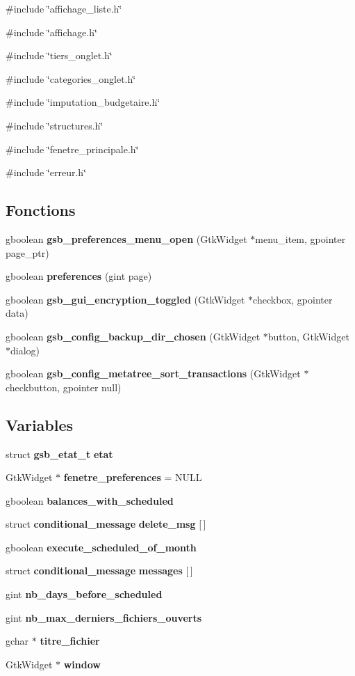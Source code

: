 {\ttfamily \#include \char`\"{}affichage\_\-liste.h\char`\"{}}\par
{\ttfamily \#include \char`\"{}affichage.h\char`\"{}}\par
{\ttfamily \#include \char`\"{}tiers\_\-onglet.h\char`\"{}}\par
{\ttfamily \#include \char`\"{}categories\_\-onglet.h\char`\"{}}\par
{\ttfamily \#include \char`\"{}imputation\_\-budgetaire.h\char`\"{}}\par
{\ttfamily \#include \char`\"{}structures.h\char`\"{}}\par
{\ttfamily \#include \char`\"{}fenetre\_\-principale.h\char`\"{}}\par
{\ttfamily \#include \char`\"{}erreur.h\char`\"{}}\par
\subsection*{Fonctions}
\begin{DoxyCompactItemize}
\item 
gboolean {\bf gsb\_\-preferences\_\-menu\_\-open} (GtkWidget $\ast$menu\_\-item, gpointer page\_\-ptr)
\item 
gboolean {\bf preferences} (gint page)
\item 
gboolean {\bf gsb\_\-gui\_\-encryption\_\-toggled} (GtkWidget $\ast$checkbox, gpointer data)
\item 
gboolean {\bf gsb\_\-config\_\-backup\_\-dir\_\-chosen} (GtkWidget $\ast$button, GtkWidget $\ast$dialog)
\item 
gboolean {\bf gsb\_\-config\_\-metatree\_\-sort\_\-transactions} (GtkWidget $\ast$checkbutton, gpointer null)
\end{DoxyCompactItemize}
\subsection*{Variables}
\begin{DoxyCompactItemize}
\item 
struct {\bf gsb\_\-etat\_\-t} {\bf etat}
\item 
GtkWidget $\ast$ {\bf fenetre\_\-preferences} = NULL
\item 
gboolean {\bf balances\_\-with\_\-scheduled}
\item 
struct {\bf conditional\_\-message} {\bf delete\_\-msg} [$\,$]
\item 
gboolean {\bf execute\_\-scheduled\_\-of\_\-month}
\item 
struct {\bf conditional\_\-message} {\bf messages} [$\,$]
\item 
gint {\bf nb\_\-days\_\-before\_\-scheduled}
\item 
gint {\bf nb\_\-max\_\-derniers\_\-fichiers\_\-ouverts}
\item 
gchar $\ast$ {\bf titre\_\-fichier}
\item 
GtkWidget $\ast$ {\bf window}
\end{DoxyCompactItemize}


